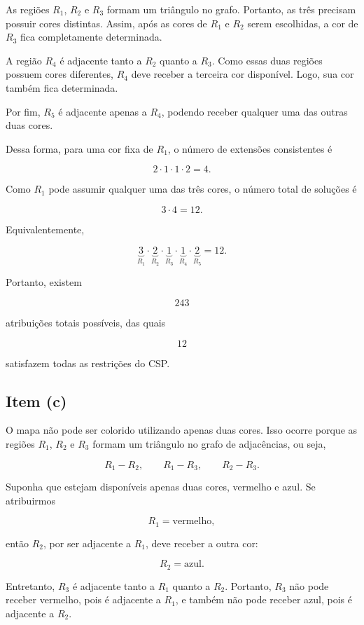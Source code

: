 As regiões $R_1$, $R_2$ e $R_3$ formam um triângulo no grafo.
Portanto, as três precisam possuir cores distintas. Assim, após as
cores de $R_1$ e $R_2$ serem escolhidas, a cor de $R_3$ fica
completamente determinada.

A região $R_4$ é adjacente tanto a $R_2$ quanto a $R_3$. Como essas
duas regiões possuem cores diferentes, $R_4$ deve receber a terceira
cor disponível. Logo, sua cor também fica determinada.

Por fim, $R_5$ é adjacente apenas a $R_4$, podendo receber qualquer
uma das outras duas cores.

Dessa forma, para uma cor fixa de $R_1$, o número de extensões
consistentes é

\[
2 \cdot 1 \cdot 1 \cdot 2 = 4.
\]

Como $R_1$ pode assumir qualquer uma das três cores, o número total de
soluções é

\[
3 \cdot 4 = 12.
\]

Equivalentemente,

\[
\underbrace{3}_{R_1}
\cdot
\underbrace{2}_{R_2}
\cdot
\underbrace{1}_{R_3}
\cdot
\underbrace{1}_{R_4}
\cdot
\underbrace{2}_{R_5}
=
12.
\]

Portanto, existem

\[
\boxed{243}
\]

atribuições totais possíveis, das quais

\[
\boxed{12}
\]

satisfazem todas as restrições do CSP.


\subsection{Item (c)}

O mapa não pode ser colorido utilizando apenas duas cores. Isso ocorre
porque as regiões $R_1$, $R_2$ e $R_3$ formam um triângulo no grafo de
adjacências, ou seja,

\[
R_1-R_2,\qquad R_1-R_3,\qquad R_2-R_3.
\]

Suponha que estejam disponíveis apenas duas cores, vermelho e azul.
Se atribuirmos

\[
R_1 = \text{vermelho},
\]

então $R_2$, por ser adjacente a $R_1$, deve receber a outra cor:

\[
R_2 = \text{azul}.
\]

Entretanto, $R_3$ é adjacente tanto a $R_1$ quanto a $R_2$. Portanto,
$R_3$ não pode receber vermelho, pois é adjacente a $R_1$, e também
não pode receber azul, pois é adjacente a $R_2$.

